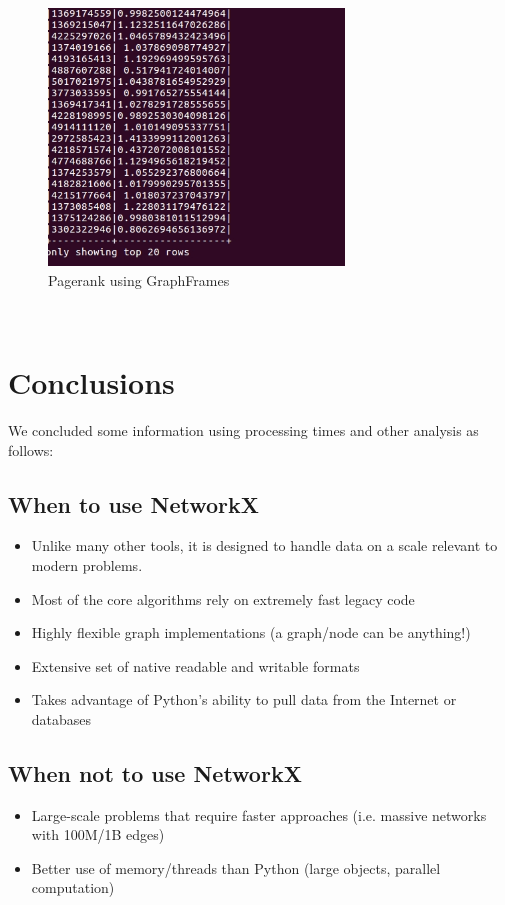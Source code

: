 \begin{figure}[!ht]
	\centering
	\includegraphics[width=0.7\textwidth]{input/images/pggf.jpg}              
	\caption{Pagerank using GraphFrames}
	\hspace{-1.5em}
\end{figure}\\
 
\section{Conclusions}
We concluded some information using processing times and other analysis as follows:  
\subsection{When to use NetworkX}
\begin{itemize}
	\item Unlike many other tools, it is designed to handle data on a scale relevant to
	modern problems.
	\item Most of the core algorithms rely on extremely fast legacy code
	\item Highly flexible graph implementations (a graph/node can be anything!)
	\item Extensive set of native readable and writable formats
	\item Takes advantage of Python’s ability to pull data from the Internet or databases
\end{itemize}
\subsection{When not to use NetworkX}
\begin{itemize}
	\item Large-scale problems that require faster approaches (i.e. massive networks
	with 100M/1B edges)
	\item Better use of memory/threads than Python (large objects, parallel computation)
\end{itemize}
 

